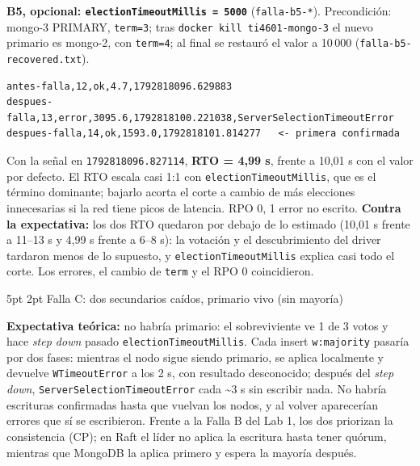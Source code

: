 \documentclass[10pt,letterpaper]{article}
\makeatletter
\renewcommand\subsection{\@startsection{subsection}{2}{\z@}%
  {5pt \@plus 1pt}{2pt}%
  {\normalfont\small\bfseries\color{acc}}}
\makeatother
\begin{document}
\textbf{B5, opcional: \texttt{electionTimeoutMillis = 5000}} (\texttt{falla-b5-*}). Precondición: mongo-3
PRIMARY, \texttt{term=3}; tras \texttt{docker kill ti4601-mongo-3} el nuevo primario es mongo-2, con
\texttt{term=4}; al final se restauró el valor a 10\,000 (\texttt{falla-b5-recovered.txt}).
\begin{Verbatim}
antes-falla,12,ok,4.7,1792818096.629883
despues-falla,13,error,3095.6,1792818100.221038,ServerSelectionTimeoutError
despues-falla,14,ok,1593.0,1792818101.814277   <- primera confirmada
\end{Verbatim}
Con la señal en \texttt{1792818096.827114}, \textbf{RTO = 4,99 s}, frente a 10,01 s con el valor por
defecto. El RTO escala casi 1:1 con \texttt{electionTimeoutMillis}, que es el término dominante; bajarlo
acorta el corte a cambio de más elecciones innecesarias si la red tiene picos de latencia. RPO 0, 1 error no
escrito. \textbf{Contra la expectativa:} los dos RTO quedaron por debajo de lo estimado (10,01 s frente a 11--13 s y
4,99 s frente a 6--8 s): la votación y el descubrimiento del driver tardaron menos de lo supuesto, y
\texttt{electionTimeoutMillis} explica casi todo el corte. Los errores, el cambio de \texttt{term} y el RPO 0
coincidieron.

\subsection{Falla C: dos secundarios caídos, primario vivo (sin mayoría)}

\textbf{Expectativa teórica:} no habría primario: el sobreviviente ve 1 de 3 votos y hace \emph{step down} pasado
\texttt{electionTimeoutMillis}. Cada insert \texttt{w:majority} pasaría por dos fases: mientras el nodo sigue siendo
primario, se aplica localmente y devuelve \texttt{WTimeoutError} a los 2 s, con resultado desconocido; después del
\emph{step down}, \texttt{ServerSelectionTimeoutError} cada \textasciitilde 3 s sin escribir nada. No habría escrituras
confirmadas hasta que vuelvan los nodos, y al volver aparecerían errores que sí se escribieron. Frente a la Falla
B del Lab 1, los dos priorizan la consistencia (CP); en Raft el líder no aplica la escritura hasta tener quórum,
mientras que MongoDB la aplica primero y espera la mayoría después.
\end{document}
